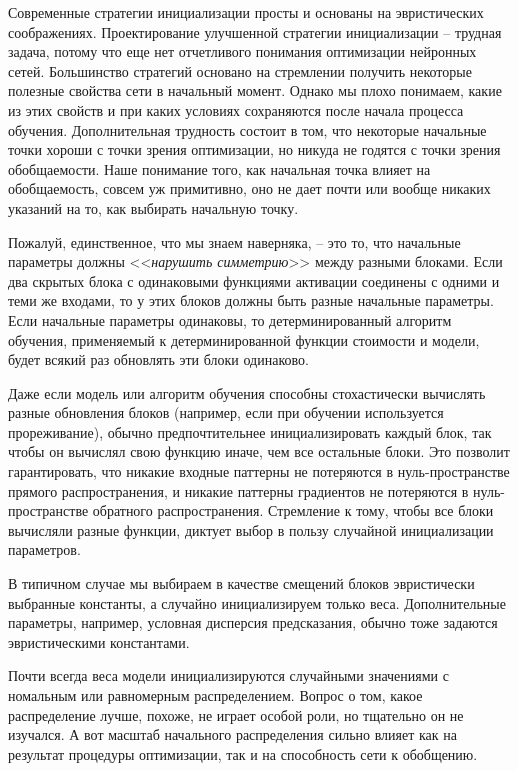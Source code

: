 \documentclass[%
	11pt,
	a4paper,
	utf8,
]{article}
\begin{document}
Современные стратегии инициализации просты и основаны на эвристических соображениях. Проектирование улучшенной стратегии инициализации -- трудная задача, потому что еще нет отчетливого понимания оптимизации нейронных сетей. Большинство стратегий основано на стремлении получить некоторые полезные свойства сети в начальный момент. Однако мы плохо понимаем, какие из этих свойств и при каких условиях сохраняются после начала процесса обучения. Дополнительная трудность состоит в том, что некоторые начальные точки хороши с точки зрения оптимизации, но никуда не годятся с точки зрения обобщаемости. Наше понимание того, как начальная точка влияет на обобщаемость, совсем уж примитивно, оно не дает почти или вообще никаких указаний на то, как выбирать начальную точку.

Пожалуй, единственное, что мы знаем наверняка, -- это то, что начальные параметры должны <<\emph{нарушить симметрию}>> между разными блоками. Если два скрытых блока с одинаковыми функциями активации соединены с одними и теми же входами, то у этих блоков должны быть разные начальные параметры. Если начальные параметры одинаковы, то детерминированный алгоритм обучения, применяемый к детерминированной функции стоимости и модели, будет всякий раз обновлять эти блоки одинаково. 

Даже если модель или алгоритм обучения способны стохастически вычислять разные обновления блоков (например, если при обучении используется прореживание), обычно предпочтительнее инициализировать каждый блок, так чтобы он вычислял свою функцию иначе, чем все остальные блоки. Это позволит гарантировать, что никакие входные паттерны не потеряются в нуль-пространстве прямого распространения, и никакие паттерны градиентов не потеряются в нуль-пространстве обратного распространения. Стремление к тому, чтобы все блоки вычисляли разные функции, диктует выбор в пользу случайной инициализации параметров.

В типичном случае мы выбираем в качестве  смещений блоков эвристически выбранные константы, а случайно инициализируем только веса. Дополнительные параметры, например, условная дисперсия предсказания, обычно тоже задаются эвристическими константами.

Почти всегда веса модели инициализируются случайными значениями с номальным или равномерным распределением. Вопрос о том, какое распределение лучше, похоже, не играет особой роли, но тщательно он не изучался. А вот масштаб начального распределения сильно влияет как на результат процедуры оптимизации, так и на способность сети к обобщению.
\end{document}
